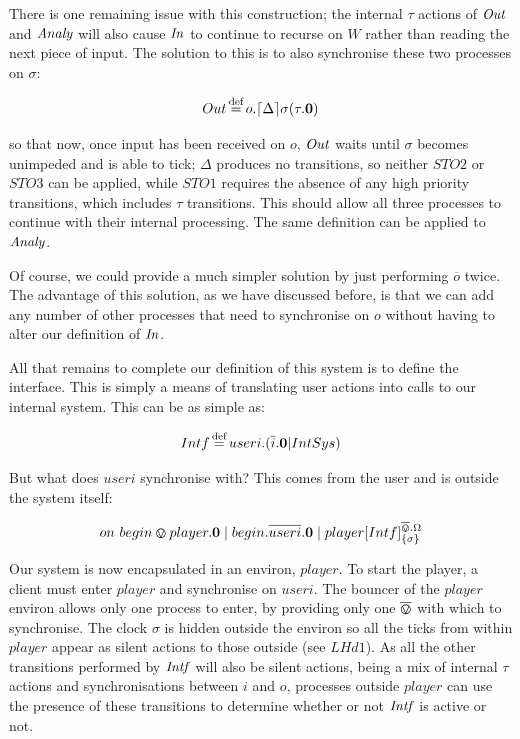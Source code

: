 There is one remaining issue with this construction; the internal
$\tau$ actions of $\mathit{Out}$ and $\mathit{Analy}$ will also cause $\mathit{In}$ to continue
to recurse on $W$ rather than reading the next piece of input.  The
solution to this is to also synchronise these two processes on
$\sigma$:

\begin{equation}
  Out \operatorname{\stackrel{\textrm{def}}{=}} o.\lceil{\Delta}\rceil {\sigma} ({\tau.\textbf{0}})
\end{equation}

\noindent so that now, once input has been received on $o$, $\mathit{Out}$
waits until $\sigma$ becomes unimpeded and is able to tick; $\Delta$
produces no transitions, so neither $STO2$ or $STO3$ can be applied,
while $STO1$ requires the absence of any high priority transitions,
which includes $\tau$ transitions. This should allow all three
processes to continue with their internal processing.  The same
definition can be applied to $\mathit{Analy}$.

Of course, we could provide a much simpler solution by just performing
$\overline{o}$ twice.  The advantage of this solution, as we have
discussed before, is that we can add any number of other processes
that need to synchronise on $o$ without having to alter our definition
of $\mathit{In}$.

All that remains to complete our definition of this system is to
define the interface.  This is simply a means of translating user
actions into calls to our internal system.  This can be as simple as:

\begin{equation}
  Intf \operatorname{\stackrel{\textrm{def}}{=}} useri.(\overline{i}.\textbf{0} | IntSys)
\end{equation}

But what does $useri$ synchronise with?  This comes from the user and
is outside the system itself:

\begin{equation}
   on\ begin \varovee player.\textbf{0} \;|\; begin.\overline{useri}.\textbf{0} \;|\; {player}[ Intf ]^{\overline{\varovee}.\Omega}_{\{\sigma\}}
\end{equation}

\noindent Our system is now encapsulated in an environ, $player$.  To
start the player, a client must enter $player$ and synchronise on
$useri$.  The bouncer of the $player$ environ allows only one process
to enter, by providing only one $\overline{\varovee}$ with which to synchronise.  The
clock $\sigma$ is hidden outside the environ so all the ticks from
within $player$ appear as silent actions to those outside (see
$LHd1$).  As all the other transitions performed by $\mathit{Intf}$ will also
be silent actions, being a mix of internal $\tau$ actions and
synchronisations between $i$ and $o$, processes outside $player$ can
use the presence of these transitions to determine whether or not
$\mathit{Intf}$ is active or not.

